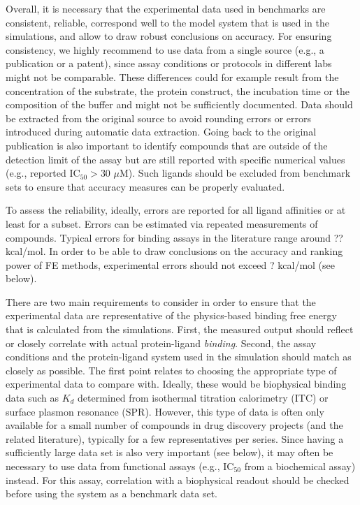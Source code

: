 \documentclass[9pt,bestpractices]{livecoms}
\begin{document}
Overall, it is necessary that the experimental data used in benchmarks are consistent, reliable, correspond well to the model system that is used in the simulations, and allow to draw robust conclusions on accuracy. For ensuring consistency, we highly recommend to use data from a single source (e.g., a publication or a patent), since assay conditions or protocols in different labs might not be comparable. These differences could for example result from the concentration of the substrate, the protein construct, the incubation time or the composition of the buffer and might not be sufficiently documented. Data should be extracted from the original source to avoid rounding errors or errors introduced during automatic data extraction. Going back to the original publication is also important to identify compounds that are outside of the detection limit of the assay but are still reported with specific numerical values (e.g., reported IC$_{50} > 30 \,\,\mu$M). Such ligands should be excluded from benchmark sets to ensure that accuracy measures can be properly evaluated.

To assess the reliability, ideally, errors are reported for all ligand affinities or at least for a subset. Errors can be estimated via repeated measurements of compounds. Typical errors for binding assays in the literature range around ?? kcal/mol. In order to be able to draw conclusions on the accuracy and ranking power of FE methods, experimental errors should not exceed ? kcal/mol (see below).

There are two main requirements to consider in order to ensure that the experimental data are representative of the physics-based binding free energy that is calculated from the simulations. First, the measured output should reflect or closely correlate with actual protein-ligand \emph{binding}. Second, the assay conditions and the protein-ligand system used in the simulation should match as closely as possible. The first point relates to choosing the appropriate type of experimental data to compare with. Ideally, these would be biophysical binding data such as $K_d$ determined from isothermal titration calorimetry (ITC) or surface plasmon resonance (SPR). However, this type of data is often only available for a small number of compounds in drug discovery projects (and the related literature), typically for a few representatives per series. Since having a sufficiently large data set is also very important (see below), it may often be necessary to use data from functional assays (e.g., IC$_{50}$ from a biochemical assay) instead. For this assay, correlation with a biophysical readout should be checked before using the system as a benchmark data set.
\end{document}
